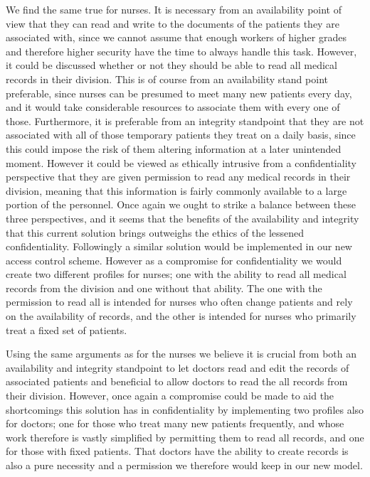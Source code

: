 \documentclass{article}
\begin{document}
We find the same true for nurses. It is necessary from an availability point of view that they can read and write to the documents of the patients they are associated with, since we cannot assume that enough workers of higher grades and therefore higher security have the time to always handle this task. However, it could be discussed whether or not they should be able to read all medical records in their division. This is of course from an availability stand point preferable, since nurses can be presumed to meet many new patients every day, and it would take considerable resources to associate them with every one of those. Furthermore, it is preferable from an integrity standpoint that they are not associated with all of those temporary patients they treat on a daily basis, since this could impose the risk of them altering information at a later unintended moment. However it could be viewed as ethically intrusive from a confidentiality perspective that they are given permission to read any medical records in their division, meaning that this information is fairly commonly available to a large portion of the personnel. Once again we ought to strike a balance between these three perspectives, and it seems that the benefits of the availability and integrity that this current solution brings outweighs the ethics of the lessened confidentiality. Followingly a similar solution would be implemented in our new access control scheme. However as a compromise for confidentiality we would create two different profiles for nurses; one with the ability to read all medical records from the division and one without that ability. The one with the permission to read all is intended for nurses who often change patients and rely on the availability of records, and the other is intended for nurses who primarily treat a fixed set of patients.

Using the same arguments as for the nurses we believe it is crucial from both an availability and integrity standpoint to let doctors read and edit the records of associated patients and beneficial to allow doctors to read the all records from their division. However, once again a compromise could be made to aid the shortcomings this solution has in confidentiality by implementing two profiles also for doctors; one for those who treat many new patients frequently, and whose work therefore is vastly simplified by permitting them to read all records, and one for those with fixed patients. That doctors have the ability to create records is also a pure necessity and a permission we therefore would keep in our new model. 
\end{document}
